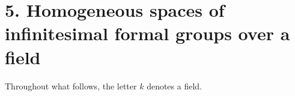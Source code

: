 
\section*{5. Homogeneous spaces of infinitesimal formal groups over a field}
\label{sga3:VIIB:5}

Throughout what follows, the letter \(k\) denotes a field.


